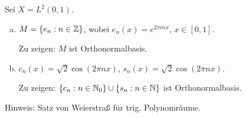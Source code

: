 \documentclass[
 a4paper,
 12pt,
 parskip=half
 ]{scrreprt}
\theoremstyle{plain}
\theoremstyle{definition}
\numberwithin{equation}{section}
\begin{document}
\begin{aufg}
  Sei $X = L^2(0,1)$.
  \begin{enumerate}[a)]
  \item $M = \{e_n : n \in \mathbb{Z} \}$, wobei $e_n(x) = e^{2 \pi i n x}$, $x
    \in [0,1]$.

    Zu zeigen: $M$ ist Orthonormalbasis.
  \item $c_n(x) = \sqrt{2} \cos (2 \pi n x)$, $s_n(x) = \sqrt{2} \cos (2 \pi n
    x)$.

    Zu zeigen: $\{ c_n : n \in \mathbb{N}_0 \} \cup \{ s_n : n \in \mathbb{N} \}$ ist
    Orthonormalbasis.
  \end{enumerate}
\end{aufg}

Hinweis: Satz von Weierstraß für trig. Polynomräume.
\end{document}
